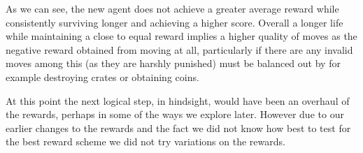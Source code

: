 As we can see, the new agent does not achieve a greater average reward while consistently surviving longer and achieving a higher score. Overall a longer life while maintaining a close to equal reward implies a higher quality of moves as the negative reward obtained from moving at all, particularly if there are any invalid moves among this (as they are harshly punished) must be balanced out by for example destroying crates or obtaining coins.

At this point the next logical step, in hindsight, would have been an overhaul of the rewards, perhaps in some of the ways we explore later. However due to our earlier changes to the rewards and the fact we did not know how best to test for the best reward scheme we did not try variations on the rewards.


